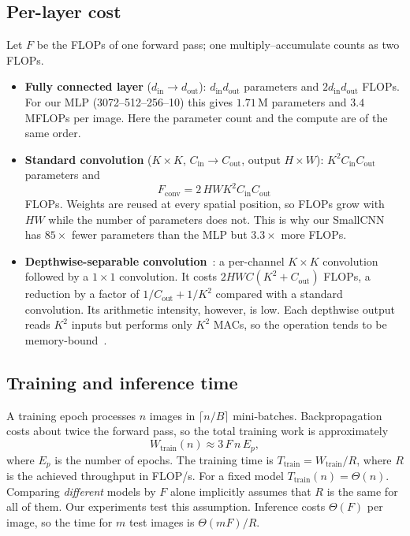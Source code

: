 \documentclass[conference]{IEEEtran}
\begin{document}
\subsection{Per-layer cost}
Let $F$ be the FLOPs of one forward pass; one multiply--accumulate counts as two FLOPs.
\begin{itemize}
  \item \textbf{Fully connected layer} ($d_{\mathrm{in}}\!\to\!d_{\mathrm{out}}$): $d_{\mathrm{in}}d_{\mathrm{out}}$ parameters and $2d_{\mathrm{in}}d_{\mathrm{out}}$ FLOPs. For our MLP (3072--512--256--10) this gives $1.71$\,M parameters and $3.4$\,MFLOPs per image. Here the parameter count and the compute are of the same order.
  \item \textbf{Standard convolution} ($K\times K$, $C_{\mathrm{in}}\!\to\!C_{\mathrm{out}}$, output $H\times W$): $K^2C_{\mathrm{in}}C_{\mathrm{out}}$ parameters and
  \begin{equation}
     F_{\mathrm{conv}} = 2\,HW K^2 C_{\mathrm{in}} C_{\mathrm{out}}
  \end{equation}
  FLOPs. Weights are reused at every spatial position, so FLOPs grow with $HW$ while the number of parameters does not. This is why our SmallCNN has $85\times$ fewer parameters than the MLP but $3.3\times$ more FLOPs.
  \item \textbf{Depthwise-separable convolution}~\cite{howard2017mobilenets}: a per-channel $K\times K$ convolution followed by a $1\times1$ convolution. It costs $2HW C(K^2 + C_{\mathrm{out}})$ FLOPs, a reduction by a factor of $1/C_{\mathrm{out}} + 1/K^2$ compared with a standard convolution. Its arithmetic intensity, however, is low. Each depthwise output reads $K^2$ inputs but performs only $K^2$ MACs, so the operation tends to be memory-bound~\cite{williams2009roofline,ma2018shufflenetv2}.
\end{itemize}

\subsection{Training and inference time}
A training epoch processes $n$ images in $\lceil n/B\rceil$ mini-batches. Backpropagation costs about twice the forward pass, so the total training work is approximately
\begin{equation}
   W_{\mathrm{train}}(n) \approx 3\,F\,n\,E_p ,
   \label{eq:work}
\end{equation}
where $E_p$ is the number of epochs. The training time is $T_{\mathrm{train}} = W_{\mathrm{train}}/R$, where $R$ is the achieved throughput in FLOP/s. For a fixed model $T_{\mathrm{train}}(n)=\Theta(n)$. Comparing \emph{different} models by $F$ alone implicitly assumes that $R$ is the same for all of them. Our experiments test this assumption. Inference costs $\Theta(F)$ per image, so the time for $m$ test images is $\Theta(mF)/R$.
\end{document}
